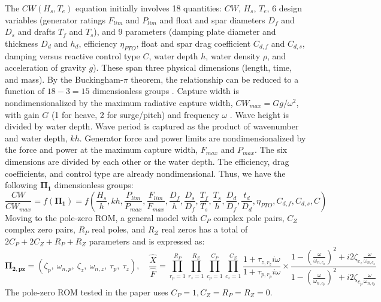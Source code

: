 \label{sec:appendix-grid}
The $CW(H_s,T_e)$ equation initially involves 18 quantities: $CW$, $H_s$, $T_e$,
6 design variables (generator ratings $F_{lim}$ and $P_{lim}$ and float and spar diameters $D_f$ and $D_s$ and drafts $T_f$ and $T_s$), 
and 9 parameters (damping plate diameter and thickness $D_d$ and $h_d$, efficiency $\eta_{PTO}$, float and spar drag coefficient $C_{d,f}$ and $C_{d,s}$, damping versus reactive control type $C$, water depth $h$, water density $\rho$, and acceleration of gravity $g$). 
These span three physical dimensions (length, time, and mass).
By the Buckingham-$\pi$ theorem, the relationship can be reduced to a function of $18-3=15$ dimensionless groups \cite{mckinley_dimensional_2021}. 
Capture width is nondimensionalized by the maximum radiative capture width, $CW_{max}=Gg/\omega^2$, with gain $G$ (1 for heave, 2 for surge/pitch) and frequency $\omega$ \cite{zou_practical_2023}. %
Wave height is divided by water depth. %
Wave period is captured as the product of wavenumber and water depth, $kh$. %
Generator force and power limits are nondimensionalized by the force and power at the maximum capture width, $F_{max}$ and $P_{max}$. %
The six dimensions are divided by each other or the water depth.%
The efficiency, drag coefficients, and control type are already nondimensional. %
Thus, we have the following $\mathbf{\Pi_1}$ dimensionless groups:
\begin{equation}
    \frac{CW}{CW_{max}} = f\left( \mathbf{\Pi_1} \right) = f\left(\frac{H_s}{h}, kh, 
    \frac{P_{lim}}{P_{max}}, \frac{F_{lim}}{F_{max}},
    \frac{D_f}{h}, \frac{D_s}{D_f}, \frac{T_f}{T_s}, \frac{T_s}{h}, \frac{D_d}{D_f}, \frac{t_d}{D_d}, 
    \eta_{PTO}, C_{d,f}, C_{d,s},  C\right)
\end{equation}
Moving to the pole-zero ROM, a general model with $C_P$ complex pole pairs, $C_Z$ complex zero pairs, $R_P$ real poles, and $R_Z$ real zeros has a total of $2C_P+2C_Z+R_P+R_Z$ parameters and is expressed as:
\begin{equation}
    \mathbf{\Pi_{2,pz}} =  \left(
        \zeta_{p},~ \omega_{n,p},~
        \zeta_{z},~ \omega_{n,z},~
        \tau_{p},~ 
        \tau_{z} 
        \right),
    \quad
    \frac{\hat{X}}{\hat{F}} = 
    \prod_{r_p=1}^{R_P} 
    \prod_{r_z=1}^{R_Z} 
    \prod_{c_p=1}^{C_P}
    \prod_{c_z=1}^{C_Z}
    \frac{1+\tau_{z,r_z} i \omega}
         {1+\tau_{p,r_p} i \omega}  \times
    \frac{1-\left(\frac{\omega}{\omega_{n,c_z}}\right)^2 + i 2 \zeta_{c_z} \frac{\omega}{\omega_{n,c_z}}}
         {1-\left(\frac{\omega}{\omega_{n,c_p}}\right)^2 + i 2 \zeta_{c_p} \frac{\omega}{\omega_{n,c_p}}}
    \quad
\end{equation}
The pole-zero ROM tested in the paper uses $C_P=1, C_Z=R_P=R_Z=0$.

